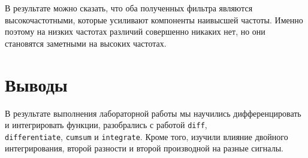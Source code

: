 \documentclass[a4paper]{article}
\begin{document}
            В результате можно сказать, что оба полученных фильтра являются высокочастотными, которые усиливают компоненты наивысшей частоты. Именно поэтому на низких частотах различий совершенно никаких нет, но они становятся заметными на высоких частотах.
            
    \newpage
        \section{Выводы}
             В результате выполнения лабораторной работы мы научились дифференцировать и интегрировать функции, разобрались с работой \texttt{diff}, \\\texttt{differentiate}, \texttt{cumsum} и \texttt{integrate}. Кроме того, изучили влияние двойного интегрирования, второй разности и второй производной  на разные сигналы.
            
\end{document}
